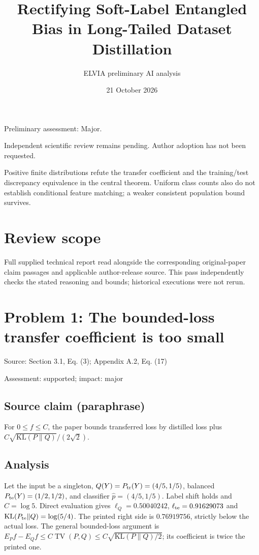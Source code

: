 \documentclass[11pt]{article}
\begin{document}
\title{Rectifying Soft-Label Entangled Bias in Long-Tailed Dataset Distillation}

\author{ELVIA preliminary AI analysis}\date{21 October 2026}\maketitle

Preliminary assessment: Major.\par

Independent scientific review remains pending. Author adoption has not been requested.

Positive finite distributions refute the transfer coefficient and the training/test discrepancy equivalence in the central theorem. Uniform class counts also do not establish conditional feature matching; a weaker consistent population bound survives.

\section*{Review scope}

Full supplied technical report read alongside the corresponding original-paper claim passages and applicable author-release source. This pass independently checks the stated reasoning and bounds; historical executions were not rerun.

\section*{Problem 1: The bounded-loss transfer coefficient is too small}

Source: Section 3.1, Eq. (3); Appendix A.2, Eq. (17)

Assessment: supported; impact: major

\subsection*{Source claim (paraphrase)}

For \(0\le f\le C\), the paper bounds transferred loss by distilled loss plus \(C\sqrt{\mathrm{KL}(P\|Q)}/(2\sqrt2)\).

\subsection*{Analysis}

Let the input be a singleton, \(Q(Y)=P_{\rm tr}(Y)=(4/5,1/5)\), balanced \(P_{\rm te}(Y)=(1/2,1/2)\), and classifier \(\widehat p=(4/5,1/5)\). Label shift holds and \(C=\log5\). Direct evaluation gives \(\ell_Q=0.50040242\), \(\ell_{\rm te}=0.91629073\) and \(\mathrm{KL}(P_{\rm te}\|Q)=\log(5/4)\). The printed right side is \(0.76919756\), strictly below the actual loss. The general bounded-loss argument is \(E_Pf-E_Qf\le C\operatorname{TV}(P,Q)\le C\sqrt{\mathrm{KL}(P\|Q)/2}\); its coefficient is twice the printed one.
\end{document}
